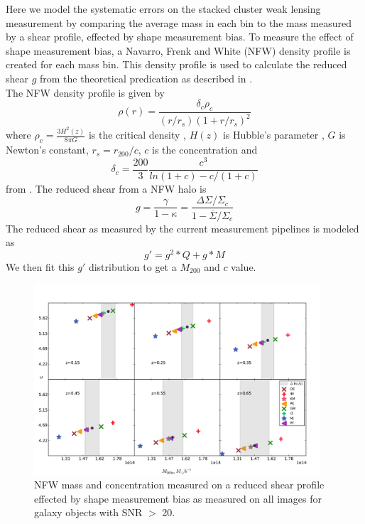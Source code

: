 Here we model the systematic errors on the stacked cluster weak
lensing measurement by comparing the average mass in each bin
to the mass measured by a shear profile, effected by shape 
measurement bias. To measure the effect of shape measurement bias, a Navarro, Frenk and White
(NFW) density profile is created for each mass bin. This density profile is
used to calculate the reduced shear $ g $ from the theoretical
predication as described in \cite{NFW}. \\
\indent The NFW density profile is given by
\begin{equation}
\rho(r) = \frac{\delta_c\rho_c}{(r/r_s)(1+ r/r_s)^{2}}
\end{equation}
where $\rho_c = \frac{3 H^2 (z) }{8 \pi G} $ is the critical density , $
H(z) $ is Hubble's parameter , $G$ is Newton's constant, $r_s =
r_{200}/c$, $c$ is the concentration and 
\begin{equation}
\delta_c = \frac{200}{3}\frac{c^3}{ln(1+c) - c/(1+c)}
\end{equation}
from \citep{NFW} . The reduced shear from a NFW
halo is 
\begin{equation}
g = \frac{\gamma}{1-\kappa} = \frac{ \Delta \Sigma / \Sigma_c }{1
-\overline{\Sigma}/ \Sigma_c}
\end{equation}
The reduced shear as measured by the current measurement pipelines is modeled as 
\begin{equation}
g' = g^2*Q + g*M
\end{equation}
We then fit this $ g' $ distribution to get a $M_{200}$ and $ c $
value. 
\begin{figure}
 \centering  %
  \includegraphics[width=0.95\textwidth]{fig/M_NFW_1.pdf} 
  \caption{NFW mass and concentration measured on a reduced shear
    profile effected by shape measurement bias
   as measured on all images for galaxy objects with SNR $>$ 20.}
\label{fig:M_NFW_1}
\end{figure}

